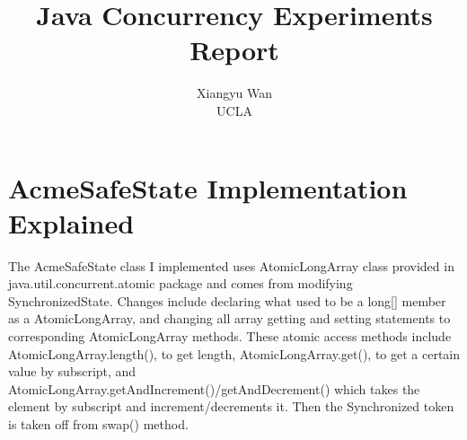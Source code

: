 \usepackage{filecontents}




\date{}

\title{\Large \bf Java Concurrency Experiments Report}

\author{
{\rm Xiangyu Wan}\\
UCLA
} %

\maketitle


\section{AcmeSafeState Implementation Explained}

The AcmeSafeState class I implemented uses AtomicLongArray class provided in java.util.concurrent.atomic package and comes from modifying SynchronizedState. 
Changes include declaring what used to be a long[] member as a AtomicLongArray, and changing all array getting and setting statements to corresponding AtomicLongArray methods.
These atomic access methods include AtomicLongArray.length(), to get length, AtomicLongArray.get(), to get a certain value by subscript, and AtomicLongArray.getAndIncrement()/getAndDecrement() which takes the element by subscript and increment/decrements it.
Then the Synchronized token is taken off from swap() method.

